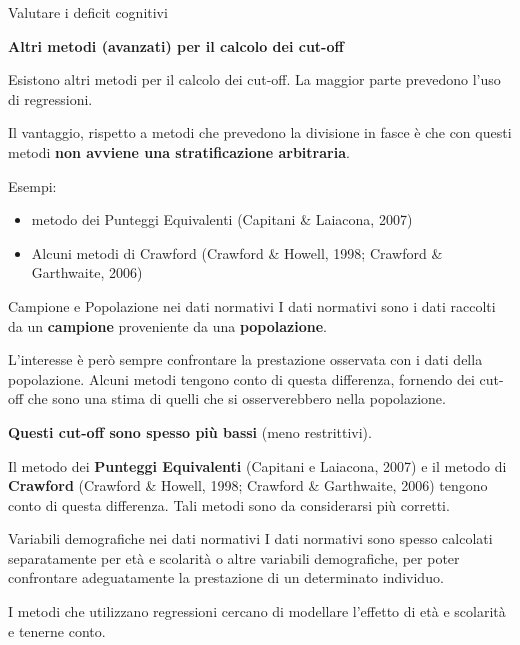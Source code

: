 \documentclass[
  ignorenonframetext,
  aspectratio=169,
]{beamer}
\begin{document}
\begin{frame}{Valutare i deficit cognitivi}
\label{valutare-i-deficit-cognitivi-15}
\begin{center}
  \textbf{Altri metodi (avanzati) per il calcolo dei cut-off}
\end{center}
\vspace{1em}

Esistono altri metodi per il calcolo dei cut-off. La maggior parte
prevedono l'uso di regressioni.

Il vantaggio, rispetto a metodi che prevedono la divisione in fasce è
che con questi metodi \textbf{non avviene una stratificazione
arbitraria}.

Esempi:

\begin{itemize}
\item
  metodo dei Punteggi Equivalenti (Capitani \& Laiacona, 2007)
\item
  Alcuni metodi di Crawford (Crawford \& Howell, 1998; Crawford \&
  Garthwaite, 2006)
\end{itemize}
\end{frame}

\begin{frame}{Campione e Popolazione nei dati normativi}
\label{campione-e-popolazione-nei-dati-normativi}
I dati normativi sono i dati raccolti da un \textbf{campione}
proveniente da una \textbf{popolazione}.

L'interesse è però sempre confrontare la prestazione osservata con i
dati della popolazione. Alcuni metodi tengono conto di questa
differenza, fornendo dei cut-off che sono una stima di quelli che si
osserverebbero nella popolazione.

\textbf{Questi cut-off sono spesso più bassi} (meno restrittivi).

Il metodo dei \textbf{Punteggi Equivalenti} (Capitani e Laiacona, 2007)
e il metodo di \textbf{Crawford} (Crawford \& Howell, 1998; Crawford \&
Garthwaite, 2006) tengono conto di questa differenza. Tali metodi sono
da considerarsi più corretti.
\end{frame}

\begin{frame}{Variabili demografiche nei dati normativi}
\label{variabili-demografiche-nei-dati-normativi}
I dati normativi sono spesso calcolati separatamente per età e scolarità
o altre variabili demografiche, per poter confrontare adeguatamente la
prestazione di un determinato individuo.

I metodi che utilizzano regressioni cercano di modellare l'effetto di
età e scolarità e tenerne conto.
\end{frame}
\end{document}
